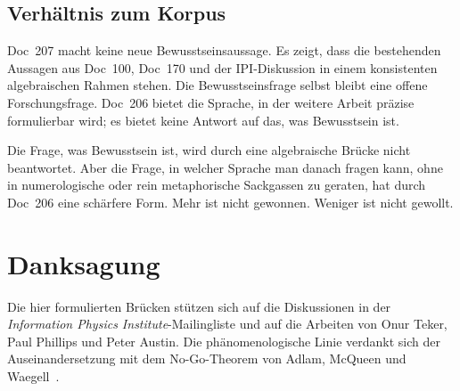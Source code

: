 \subsection{Verhältnis zum Korpus}

\begin{center}
\end{center}

Doc~207 macht keine neue Bewusstseinsaussage. Es zeigt, dass die bestehenden Aussagen aus Doc~100, Doc~170 und der IPI-Diskussion in einem konsistenten algebraischen Rahmen stehen. Die Bewusstseinsfrage selbst bleibt eine offene Forschungsfrage. Doc~206 bietet die Sprache, in der weitere Arbeit präzise formulierbar wird; es bietet keine Antwort auf das, was Bewusstsein ist.

\begin{philosophical}[Schluss]
Die Frage, was Bewusstsein ist, wird durch eine algebraische Brücke nicht beantwortet. Aber die Frage, in welcher Sprache man danach fragen kann, ohne in numerologische oder rein metaphorische Sackgassen zu geraten, hat durch Doc~206 eine schärfere Form. Mehr ist nicht gewonnen. Weniger ist nicht gewollt.
\end{philosophical}

\section*{Danksagung}

Die hier formulierten Brücken stützen sich auf die Diskussionen in der \emph{Information Physics Institute}-Mailingliste und auf die Arbeiten von Onur Teker, Paul Phillips und Peter Austin. Die phänomenologische Linie verdankt sich der Auseinandersetzung mit dem No-Go-Theorem von Adlam, McQueen und Waegell~\cite{Adlam2025}.

